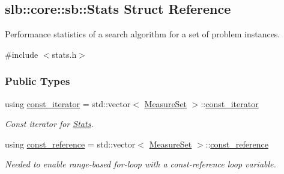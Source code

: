 \hypertarget{structslb_1_1core_1_1sb_1_1Stats}{}\subsection{slb\+:\+:core\+:\+:sb\+:\+:Stats Struct Reference}
\label{structslb_1_1core_1_1sb_1_1Stats}


Performance statistics of a search algorithm for a set of problem instances.  




{\ttfamily \#include $<$stats.\+h$>$}

\subsubsection*{Public Types}
\begin{DoxyCompactItemize}
\item 
using \hyperlink{structslb_1_1core_1_1sb_1_1Stats_a34123246b559ca14a67acc484d3635c0}{const\+\_\+iterator} = std\+::vector$<$ \hyperlink{structslb_1_1core_1_1sb_1_1MeasureSet}{Measure\+Set} $>$\+::\hyperlink{structslb_1_1core_1_1sb_1_1Stats_a34123246b559ca14a67acc484d3635c0}{const\+\_\+iterator}\hypertarget{structslb_1_1core_1_1sb_1_1Stats_a34123246b559ca14a67acc484d3635c0}{}\label{structslb_1_1core_1_1sb_1_1Stats_a34123246b559ca14a67acc484d3635c0}

\begin{DoxyCompactList}\small\item\em Const iterator for \hyperlink{structslb_1_1core_1_1sb_1_1Stats}{Stats}. \end{DoxyCompactList}\item 
using \hyperlink{structslb_1_1core_1_1sb_1_1Stats_ae296c02e1a20127f5b13f7170887d00c}{const\+\_\+reference} = std\+::vector$<$ \hyperlink{structslb_1_1core_1_1sb_1_1MeasureSet}{Measure\+Set} $>$\+::\hyperlink{structslb_1_1core_1_1sb_1_1Stats_ae296c02e1a20127f5b13f7170887d00c}{const\+\_\+reference}\hypertarget{structslb_1_1core_1_1sb_1_1Stats_ae296c02e1a20127f5b13f7170887d00c}{}\label{structslb_1_1core_1_1sb_1_1Stats_ae296c02e1a20127f5b13f7170887d00c}

\begin{DoxyCompactList}\small\item\em Needed to enable range-\/based for-\/loop with a const-\/reference loop variable. \end{DoxyCompactList}\end{DoxyCompactItemize}
